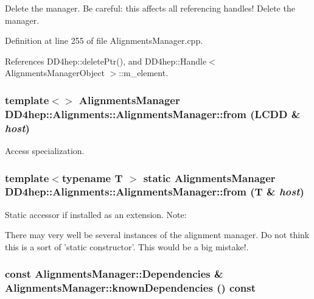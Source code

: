 Delete the manager. Be careful: this affects all referencing handles! Delete the manager. 

Definition at line 255 of file AlignmentsManager.cpp.

References DD4hep::deletePtr(), and DD4hep::Handle$<$ AlignmentsManagerObject $>$::m\_\-element.\hypertarget{class_d_d4hep_1_1_alignments_1_1_alignments_manager_a577f536ca106e3c3715935ac5ba210e1}{
\subsubsection[{from}]{\setlength{\rightskip}{0pt plus 5cm}template$<$$>$ {\bf AlignmentsManager} DD4hep::Alignments::AlignmentsManager::from (LCDD \& {\em host})}}
\label{class_d_d4hep_1_1_alignments_1_1_alignments_manager_a577f536ca106e3c3715935ac5ba210e1}


Access specialization. \hypertarget{class_d_d4hep_1_1_alignments_1_1_alignments_manager_ad1677dd241c59534c19caee3b88a3c9f}{
\subsubsection[{from}]{\setlength{\rightskip}{0pt plus 5cm}template$<$typename T $>$ static {\bf AlignmentsManager} DD4hep::Alignments::AlignmentsManager::from ({\bf T} \& {\em host})}}
\label{class_d_d4hep_1_1_alignments_1_1_alignments_manager_ad1677dd241c59534c19caee3b88a3c9f}


Static accessor if installed as an extension. Note:

There may very well be several instances of the alignment manager. Do not think this is a sort of 'static constructor'. This would be a big mistake!. \hypertarget{class_d_d4hep_1_1_alignments_1_1_alignments_manager_afb8a66c27828028df5b869cb665ba87d}{
\subsubsection[{knownDependencies}]{\setlength{\rightskip}{0pt plus 5cm}const {\bf AlignmentsManager::Dependencies} \& AlignmentsManager::knownDependencies () const}}
\label{class_d_d4hep_1_1_alignments_1_1_alignments_manager_afb8a66c27828028df5b869cb665ba87d}


